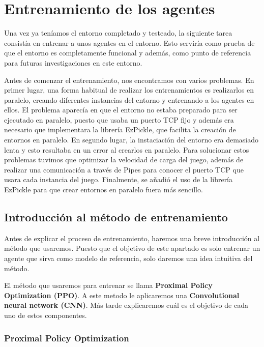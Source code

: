 \chapter{Entrenamiento de los agentes}
\label{section:Entrenamiento de los agentes}

Una vez ya teníamos el entorno completado y testeado, la siguiente tarea consistía en entrenar a unos agentes en el entorno. Esto serviría como prueba de que el entorno es completamente funcional y además, como punto de referencia para futuras investigaciones en este entorno.

Antes de comenzar el entrenamiento, nos encontramos con varios problemas. En primer lugar, una forma habitual de realizar los entrenamientos es realizarlos en paralelo, creando diferentes instancias del entorno y entrenando a los agentes en ellos. El problema aparecía en que el entorno no estaba preparado para ser ejecutado en paralelo, puesto que usaba un puerto TCP fijo y además era necesario que implementara la librería EzPickle, que facilita la creación de entornos en paralelo. En segundo lugar, la instaciación del entorno era demasiado lenta y esto resultaba en un error al crearlos en paralelo. Para solucionar estos problemas tuvimos que optimizar la velocidad de carga del juego, además de realizar una comunicación a través de Pipes para conocer el puerto TCP que usara cada instancia del juego. Finalmente, se añadió el uso de la librería EzPickle para que crear entornos en paralelo fuera más sencillo.

\section{Introducción al método de entrenamiento}

Antes de explicar el proceso de entrenamiento, haremos una breve introducción al método que usaremos. Puesto que el objetivo de este apartado es solo entrenar un agente que sirva como modelo de referencia, solo daremos una idea intuitiva del método.

El método que usaremos para entrenar se llama \textbf{Proximal Policy Optimization (PPO)}. A este metodo le aplicaremos una \textbf{Convolutional neural network (CNN)}. Más tarde explicaremos cuál es el objetivo de cada uno de estos componentes.

\subsection*{Proximal Policy Optimization}

